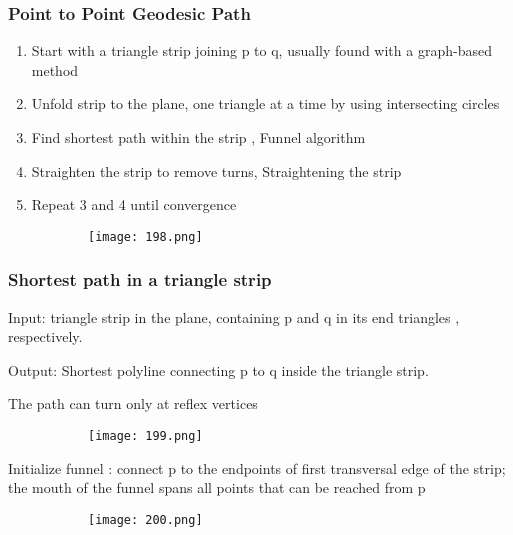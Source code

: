 \documentclass{article}
\begin{document}
\subsubsection{Point to Point Geodesic Path}

\begin{enumerate}
    \item Start with a triangle strip joining p to q, usually found with a graph-based method
    \item Unfold strip to the plane, one triangle at a time by using intersecting circles
    \item Find shortest path within the strip , Funnel algorithm
    \item Straighten the strip to remove turns, Straightening the strip
    \item Repeat 3 and 4 until convergence
\end{enumerate}

 \begin{figure}[ht!]
  \centering
  \begin{subfigure}[b]{0.2\linewidth}
    \texttt{[image: 198.png]}
  \end{subfigure}
\end{figure}

\subsubsection{Shortest path in a triangle strip}

Input: triangle strip in the plane, containing p and q in its end triangles , respectively.

Output: Shortest polyline connecting p to q inside the triangle strip.

The path can turn only at reflex vertices

 \begin{figure}[ht!]
  \centering
  \begin{subfigure}[b]{0.3\linewidth}
    \texttt{[image: 199.png]}
  \end{subfigure}
\end{figure}

Initialize funnel : connect p to the endpoints of first transversal edge of the strip; the mouth of the funnel spans all points that can be reached from p

 \begin{figure}[ht!]
  \centering
  \begin{subfigure}[b]{0.3\linewidth}
    \texttt{[image: 200.png]}
  \end{subfigure}
\end{figure}
\end{document}
